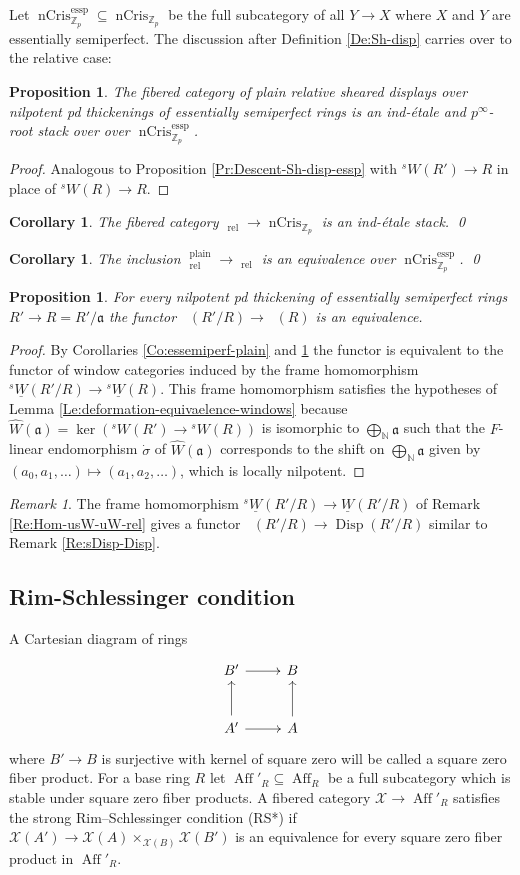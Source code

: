 \documentclass[a4paper,11pt]{amsart}
\theoremstyle{plain}
\newtheorem{Prop}[equation]{Proposition}
\newtheorem{Cor}[equation]{Corollary}
\theoremstyle{definition}
\theoremstyle{remark}
\newtheorem{Remark}[equation]{Remark}
\newcommand{\bPr}{\begin{Prop}}
\newcommand{\ePr}{\end{Prop}}
\newcommand{\bCo}{\begin{Cor}}
\newcommand{\eCo}{\end{Cor}}
\newcommand{\bRe}{\begin{Remark}}
\newcommand{\eRe}{\end{Remark}}
\newcommand{\bproof}{\begin{proof}}
\newcommand{\eproof}{\end{proof}}
\newcommand{\beqn}{\begin{equation}}
\newcommand{\eeqn}{\end{equation}}
\renewcommand{\u}{\underline}
\numberwithin{equation}{section}
\newcommand{\XXX}{\mathcal{X}}
\newcommand{\Fa}{\mathfrak{a}}
\newcommand{\NN}{{\mathbb{N}}}
\newcommand{\ZZ}{{\mathbb{Z}}}
\DeclareMathOperator{\essemiperf}{essp}
\DeclareMathOperator{\plain}{plain}
\DeclareMathOperator{\rel}{rel}
\DeclareMathOperator{\Aff}{Aff}
\DeclareMathOperator{\nCrys}{nCris}
\DeclareMathOperator{\Disp}{Disp}
\DeclareMathOperator{\sDisp}{{}^sDisp}
\newcommand{\sW}{{}^sW}
\newcommand{\usW}{{}^s\u W}
\begin{document}
Let $\nCrys_{\ZZ_p}^{\essemiperf}\subseteq\nCrys_{\ZZ_p}$ be the full subcategory of all $Y\to X$ where $X$ and $Y$ are essentially semiperfect. The discussion after Definition \ref{De:Sh-disp} carries over to the relative case:

\bPr
\label{Pr:Descent-Sh-disp-rel-essp}
The fibered category of plain relative sheared displays over nilpotent pd thickenings of essentially semiperfect rings 
is an ind-\'etale and $p^{\infty}$-root stack over over $\nCrys_{\ZZ_p}^{\essemiperf}$.
\ePr

\bproof
Analogous to Proposition \ref{Pr:Descent-Sh-disp-essp} with $\sW(R')\to R$ in place of $\sW(R)\to R$.
\eproof

\bCo
The fibered category $\sDisp_{\rel}\to\nCrys_{\ZZ_p}$ is an ind-\'etale stack. \qed
\eCo

\bCo
\label{Co:essemiperf-rel-plain}
The inclusion $\sDisp_{\rel}^{\plain}\to\sDisp_{\rel}$ is an equivalence over $\nCrys_{\ZZ_p}^{\essemiperf}$. \qed
\eCo

\bPr
\label{Pr:sDisp(R'/R)-sDisp(R)}
For every nilpotent pd thickening of essentially semiperfect rings $R'\to R=R'/\Fa$ the functor $\sDisp(R'/R)\to\sDisp(R)$ is an equivalence.
\ePr

\bproof
By Corollaries \ref{Co:essemiperf-plain} and \ref{Co:essemiperf-rel-plain} the functor is equivalent to the functor of window categories induced by  the frame homomorphism $\usW(R'/R)\to\usW(R)$. This frame homomorphism satisfies the hypotheses of Lemma \ref{Le:deformation-equivaelence-windows} because $\hat W(\Fa)=\ker(\sW(R')\to\sW(R))$ is isomorphic to $\bigoplus_{\NN}\Fa$ such that the $F$-linear endomorphism $\dot\sigma$ of $\hat W(\Fa)$ corresponds to the shift on $\bigoplus_{\NN}\Fa$ given by $(a_0,a_1,\ldots)\mapsto(a_1,a_2,\ldots)$, which is locally nilpotent.
\eproof

\bRe
The frame homomorphism $\usW(R'/R)\to\u W(R'/R)$ of Remark \ref{Re:Hom-usW-uW-rel} gives a functor $\sDisp(R'/R)\to\Disp(R'/R)$ similar to Remark \ref{Re:sDisp-Disp}.
\eRe

\subsection{Rim-Schlessinger condition}

A Cartesian diagram of rings
\beqn
\label{Eq:sq-zero-fib-prod}
\xymatrix@M+0.2em{
B' \ar[r] & B \\
A' \ar[r] \ar[u] & A \ar[u]
}
\eeqn
where $B'\to B$ is surjective with kernel of square zero will be called a square zero fiber product. For a base ring $R$ let $\Aff'_R\subseteq\Aff_R$ be a full subcategory which is stable under square zero fiber products. A fibered category $\XXX\to\Aff'_R$ satisfies the strong Rim--Schlessinger condition (RS*) if $\XXX(A')\to\XXX(A)\times_{\XXX(B)}\XXX(B')$ is an equivalence for every square zero fiber product in $\Aff'_R$.
\end{document}
